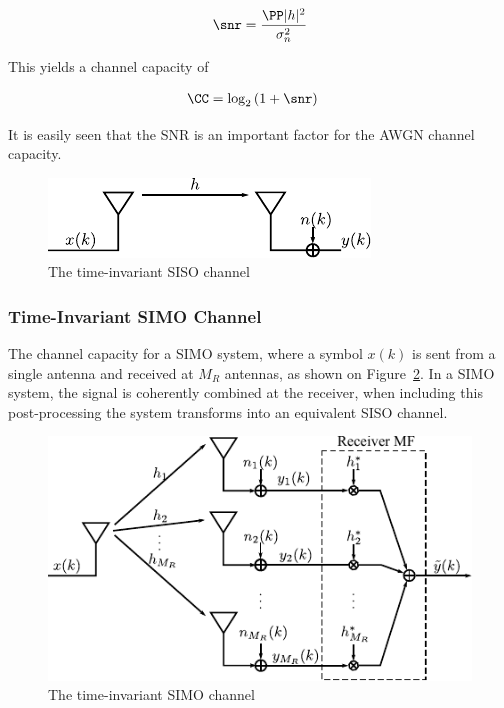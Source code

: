 \begin{align*}
  \snr = \frac{\PP |h|^2}{\sigma_n^2}
\end{align*}

This yields a channel capacity of 

\begin{align*}
      \CC &= \log_2 \left( 1 + \snr \right)
\end{align*}

It is easily seen that the SNR is an important factor for the AWGN channel capacity.

\begin{figure}[hbp]
  \centering
  \includegraphics[scale=1.2]{img/analysis/sisoModel}
  \caption{The time-invariant SISO channel}
  \label{fig:sisoModel}
\end{figure}


\subsubsection{Time-Invariant SIMO Channel}
The channel capacity for a SIMO system, where a symbol $x(k)$ is sent from a single antenna and received at $M_R$ antennas, as shown on Figure~\ref{fig:simoModel}. In a SIMO system, the signal is coherently combined at the receiver, when including this post-processing the system transforms into an equivalent SISO channel\cite{Tim2012Practical}. 
\begin{figure}[htbp]
  \centering
  \includegraphics[scale=1.2]{img/analysis/simoModel}
  \caption{The time-invariant SIMO channel}
  \label{fig:simoModel}
\end{figure}

